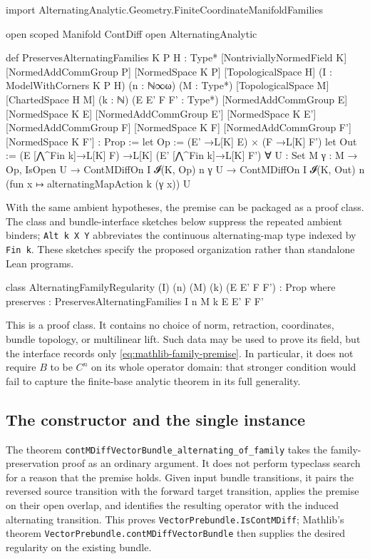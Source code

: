 \documentclass[11pt]{amsart}
\theoremstyle{definition}
\theoremstyle{remark}
\numberwithin{equation}{section}
\begin{document}
\begin{leancode}
import AlternatingAnalytic.Geometry.FiniteCoordinateManifoldFamilies

open scoped Manifold ContDiff
open AlternatingAnalytic

def PreservesAlternatingFamilies
    {K P H : Type*} [NontriviallyNormedField K]
    [NormedAddCommGroup P] [NormedSpace K P]
    [TopologicalSpace H] (I : ModelWithCorners K P H)
    (n : ℕ∞ω) (M : Type*)
    [TopologicalSpace M] [ChartedSpace H M]
    (k : ℕ) (E E' F F' : Type*)
    [NormedAddCommGroup E] [NormedSpace K E]
    [NormedAddCommGroup E'] [NormedSpace K E']
    [NormedAddCommGroup F] [NormedSpace K F]
    [NormedAddCommGroup F'] [NormedSpace K F'] : Prop :=
  let Op := (E' →L[K] E) × (F →L[K] F')
  let Out := (E [⋀^Fin k]→L[K] F) →L[K]
    (E' [⋀^Fin k]→L[K] F')
  ∀ {U : Set M} {γ : M → Op}, IsOpen U →
    ContMDiffOn I 𝓘(K, Op) n γ U →
    ContMDiffOn I 𝓘(K, Out) n
      (fun x ↦ alternatingMapAction k (γ x)) U
\end{leancode}

With the same ambient hypotheses, the premise can be packaged as a proof class. The class and
bundle-interface sketches below suppress the repeated ambient binders;
\texttt{Alt k X Y} abbreviates the continuous alternating-map type indexed by \texttt{Fin k}.
These sketches specify the proposed organization rather than standalone Lean programs.

\begin{leancode}
class AlternatingFamilyRegularity
    (I) (n) (M) (k) (E E' F F') : Prop where
  preserves : PreservesAlternatingFamilies
    I n M k E E' F F'
\end{leancode}

This is a proof class. It contains no choice of norm, retraction, coordinates, bundle topology, or
multilinear lift. Such data may be used to prove its field, but the interface records only
\eqref{eq:mathlib-family-premise}. In particular, it does not require $B$ to be $C^n$ on its whole
operator domain: that stronger condition would fail to capture the finite-base analytic theorem
in its full generality.

\subsection{The constructor and the single instance}

The theorem
\texttt{contMDiffVectorBundle\_\allowbreak alternating\_\allowbreak of\_\allowbreak family}
takes the family-preservation proof as an ordinary argument. It does not perform typeclass search
for a reason that the premise holds. Given input bundle transitions, it pairs the reversed source
transition with the forward target transition, applies the premise on their open overlap, and
identifies the resulting operator with the induced alternating transition. This proves
\texttt{VectorPrebundle.\allowbreak IsContMDiff}; Mathlib's theorem
\texttt{VectorPrebundle.\allowbreak contMDiffVectorBundle} then supplies the desired regularity on the existing
bundle.
\end{document}
